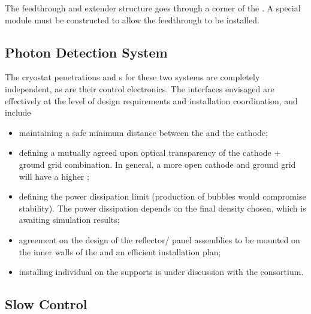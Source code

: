 The  feedthrough and extender structure goes through a corner of the .  A special  module must be constructed to allow the  feedthrough to be installed.


\subsection{Photon Detection System}
\label{sec:fddp-hv-intfc-to-pds}


The cryostat penetrations and \fdth{}s for these two systems are completely independent, as are their control electronics. The interfaces envisaged are effectively at the level of design requirements and installation coordination, and include

\begin{itemize}
    \item maintaining a safe minimum distance between the  and the \dptargetdriftvoltneg cathode;
    \item defining a mutually agreed upon optical transparency of the cathode + ground grid combination.  In general, a more open cathode and ground grid will have a higher \efield;
    \item  defining the  power dissipation limit (production of bubbles would compromise  stability). The power dissipation depends on the final  density chosen, which is awaiting simulation results;
    \item agreement on the design of the reflector/ panel assemblies to be mounted on the inner walls of the  and an efficient installation plan;
    \item installing individual  on the  supports is under discussion with the  consortium.
\end{itemize}


\subsection{Slow Control}
\label{sec:fddp-hv-intfc-to-cisc}

